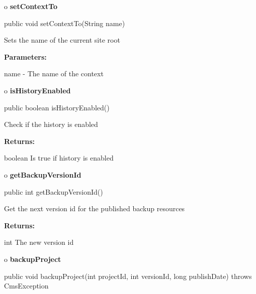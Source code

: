 o {\bf setContextTo} 

\begin{PRE}
 public void setContextTo(String name)
\end{PRE}

\begin{description}
\htmlDD Sets the name of the current site root 

\begin{description}
\item {\bf Parameters:}  

name - The name of the context  
\end{description}

\end{description}

o {\bf isHistoryEnabled} 

\begin{PRE}
 public boolean isHistoryEnabled()
\end{PRE}

\begin{description}
\htmlDD Check if the history is enabled 

\begin{description}
\item {\bf Returns:}  

boolean Is true if history is enabled  
\end{description}

\end{description}

o {\bf getBackupVersionId} 

\begin{PRE}
 public int getBackupVersionId()
\end{PRE}

\begin{description}
\htmlDD Get the next version id for the published backup resources 

\begin{description}
\item {\bf Returns:}  

int The new version id  
\end{description}

\end{description}

o {\bf backupProject} 

\begin{PRE}
 public void backupProject(int projectId,
                           int versionId,
                           long publishDate) throws CmsException
\end{PRE}

